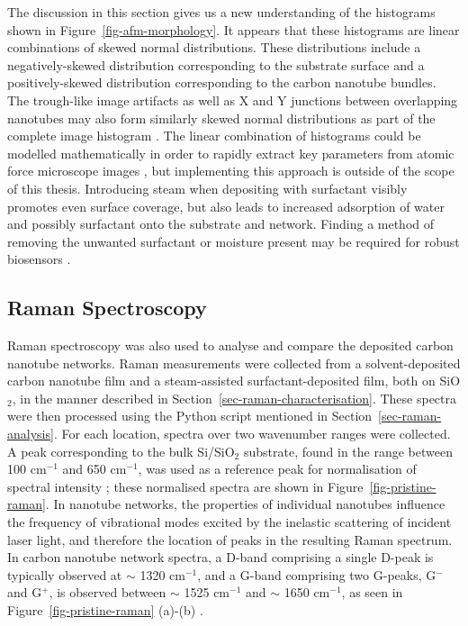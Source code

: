 \documentclass[
  a4paper,
]{scrbook}
\begin{document}
The discussion in this section gives us a new understanding of the
histograms shown in Figure~\ref{fig-afm-morphology}. It appears that
these histograms are linear combinations of skewed normal distributions.
These distributions include a negatively-skewed distribution
corresponding to the substrate surface and a positively-skewed
distribution corresponding to the carbon nanotube bundles. The
trough-like image artifacts as well as X and Y junctions between
overlapping nanotubes may also form similarly skewed normal
distributions as part of the complete image histogram
\autocite{Murugathas2018}. The linear combination of histograms could be
modelled mathematically in order to rapidly extract key parameters from
atomic force microscope images \autocite{Marchenko2010}, but
implementing this approach is outside of the scope of this thesis.
Introducing steam when depositing with surfactant visibly promotes even
surface coverage, but also leads to increased adsorption of water and
possibly surfactant onto the substrate and network. Finding a method of
removing the unwanted surfactant or moisture present may be required for
robust biosensors \autocite{Kane2014,Barnett2018}.

\hypertarget{sec-pristine-raman}{%
\subsection{Raman Spectroscopy}\label{sec-pristine-raman}}

Raman spectroscopy was also used to analyse and compare the deposited
carbon nanotube networks. Raman measurements were collected from a
solvent-deposited carbon nanotube film and a steam-assisted
surfactant-deposited film, both on SiO\(_2\), in the manner described in
Section~\ref{sec-raman-characterisation}. These spectra were then
processed using the Python script mentioned in
Section~\ref{sec-raman-analysis}. For each location, spectra over two
wavenumber ranges were collected. A peak corresponding to the bulk
Si/SiO\(_2\) substrate, found in the range between 100 cm\(^{-1}\) and
650 cm\(^{-1}\), was used as a reference peak for normalisation of
spectral intensity \autocite{E2015}; these normalised spectra are shown
in Figure~\ref{fig-pristine-raman}. In nanotube networks, the properties
of individual nanotubes influence the frequency of vibrational modes
excited by the inelastic scattering of incident laser light, and
therefore the location of peaks in the resulting Raman spectrum. In
carbon nanotube network spectra, a D-band comprising a single D-peak is
typically observed at \(\sim\) 1320 cm\(^{-1}\), and a G-band comprising
two G-peaks, G\(^-\) and G\(^+\), is observed between \(\sim\) 1525
cm\(^{-1}\) and \(\sim\) 1650 cm\(^{-1}\), as seen in
Figure~\ref{fig-pristine-raman} (a)-(b)
\autocite{Dresselhaus2005,King2014,E2015}.
\end{document}
